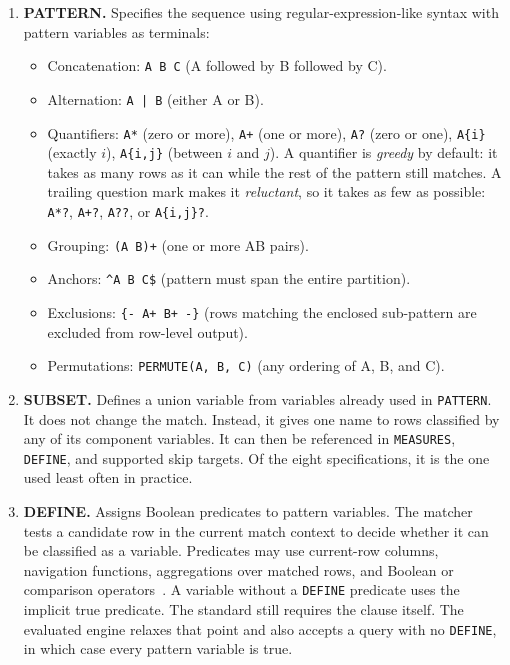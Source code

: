 \begin{enumerate}
\item \textbf{PATTERN.}
  Specifies the sequence using regular-expression-like syntax with
  pattern variables as terminals:
  \begin{itemize}
    \item Concatenation: \texttt{A~B~C} (A followed by B followed by C).
    \item Alternation: \texttt{A~|~B} (either A or B).
    \item Quantifiers: \texttt{A*} (zero or more), \texttt{A+}
      (one or more), \texttt{A?} (zero or one), \texttt{A\{i\}}
      (exactly $i$), \texttt{A\{i,j\}} (between $i$ and $j$).
      A quantifier is \emph{greedy} by default: it takes as many rows
      as it can while the rest of the pattern still matches.  A
      trailing question mark makes it \emph{reluctant}, so it takes as
      few as possible: \texttt{A*?}, \texttt{A+?}, \texttt{A??}, or
      \texttt{A\{i,j\}?}.
    \item Grouping: \texttt{(A~B)+} (one or more AB pairs).
    \item Anchors: \texttt{\^{}A~B~C\$} (pattern must span the
      entire partition).
    \item Exclusions: \texttt{\{-~A+~B+~-\}} (rows matching the
      enclosed sub-pattern are excluded from row-level output).
    \item Permutations: \texttt{PERMUTE(A,~B,~C)} (any ordering
      of A, B, and C).
  \end{itemize}

\item \textbf{SUBSET.}
Defines a union variable from variables already used in
\texttt{PATTERN}.  It does not change the match.
Instead, it gives one name to rows classified by any of its component
variables.  It can then be referenced in \texttt{MEASURES},
\texttt{DEFINE}, and supported skip targets.  Of the eight
specifications, it is the one used least often in practice.


\item \textbf{DEFINE.}
Assigns Boolean predicates to pattern
variables.  The matcher tests a candidate row in the current match
context to decide whether it can be classified as a variable.
Predicates may use current-row columns, navigation functions,
aggregations over matched rows, and Boolean or comparison
operators~\cite{winand_match_recognize}.  A variable without a
\texttt{DEFINE} predicate uses the implicit true predicate.  The
standard still requires the clause itself.  The evaluated engine
relaxes that point and also accepts a query with no \texttt{DEFINE},
in which case every pattern variable is true.

\end{enumerate}

